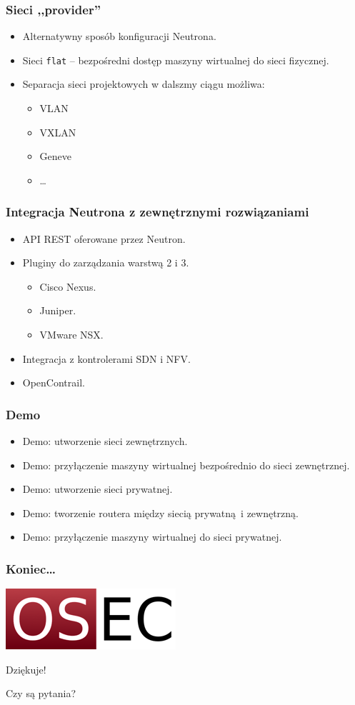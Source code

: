 \documentclass[dvipsnames,table]{beamer}
\begin{document}
\begin{frame}
\frametitle{Sieci ,,provider''}
\begin{itemize}
	\item Alternatywny sposób konfiguracji Neutrona.
	\item Sieci {\tt flat} -- bezpośredni dostęp maszyny wirtualnej do sieci fizycznej.
	\item Separacja sieci projektowych w dalszmy ciągu możliwa:
	\begin{itemize}
		\item VLAN
		\item VXLAN
		\item Geneve
		\item \dots
	\end{itemize}
\end{itemize}
\end{frame}

\begin{frame}
\frametitle{Integracja Neutrona z zewnętrznymi rozwiązaniami}
\begin{itemize}
	\item API REST oferowane przez Neutron.
	\item Pluginy do zarządzania warstwą 2 i 3.
	\begin{itemize}
		\item Cisco Nexus.
		\item Juniper.
		\item VMware NSX.
	\end{itemize}
	\item Integracja z kontrolerami SDN i NFV.
	\item OpenContrail.
\end{itemize}
\end{frame}

\begin{frame}
\frametitle{Demo}
\begin{itemize}
	\item Demo: utworzenie sieci zewnętrznych.
	\item Demo: przyłączenie maszyny wirtualnej bezpośrednio do sieci zewnętrznej.
	\item Demo: utworzenie sieci prywatnej.
	\item Demo: tworzenie routera między siecią prywatną i zewnętrzną.
	\item Demo: przyłączenie maszyny wirtualnej do sieci prywatnej.
\end{itemize}
\end{frame}

\begin{frame}
\frametitle{Koniec\ldots}
\begin{center}
\includegraphics[scale=0.5]{img-oseclogo.png}

Dziękuje!

Czy są pytania?

\end{center}
\end{frame}
\end{document}

